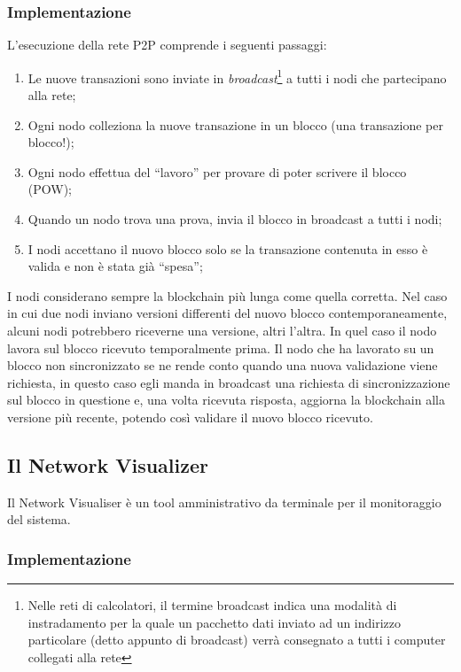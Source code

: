 \subsubsection{Implementazione}
L'esecuzione della rete P2P comprende i seguenti passaggi:
\begin{enumerate}
    \item Le nuove transazioni sono inviate in \textit{broadcast}\footnote{Nelle reti di calcolatori, il termine broadcast indica una modalità di instradamento per la quale un pacchetto dati inviato ad un indirizzo particolare (detto appunto di broadcast) verrà consegnato a tutti i computer collegati alla rete} a tutti i nodi che partecipano alla rete;
    \item Ogni nodo colleziona la nuove transazione in un blocco (una transazione per blocco!);
    \item Ogni nodo effettua del ``lavoro'' per provare di poter scrivere il blocco (POW);
    \item Quando un nodo trova una prova, invia il blocco in broadcast a tutti i nodi;
    \item I nodi accettano il nuovo blocco solo se la transazione contenuta in esso è valida e non è stata già ``spesa'';
\end{enumerate}

I nodi considerano sempre la blockchain più lunga come quella corretta. Nel caso in cui due nodi inviano versioni differenti del nuovo blocco contemporaneamente, alcuni nodi potrebbero riceverne  una versione, altri l'altra. In quel caso il nodo lavora sul blocco ricevuto temporalmente prima. Il nodo che ha lavorato su un blocco non sincronizzato se ne rende conto quando una nuova validazione viene richiesta, in questo caso egli manda in broadcast una richiesta di sincronizzazione sul blocco in questione e, una volta ricevuta risposta, aggiorna la blockchain alla versione più recente, potendo così validare il nuovo blocco ricevuto.

\subsection{Il Network Visualizer}
Il Network Visualiser è un tool amministrativo da terminale per il monitoraggio del sistema.

\subsubsection{Implementazione}
%
